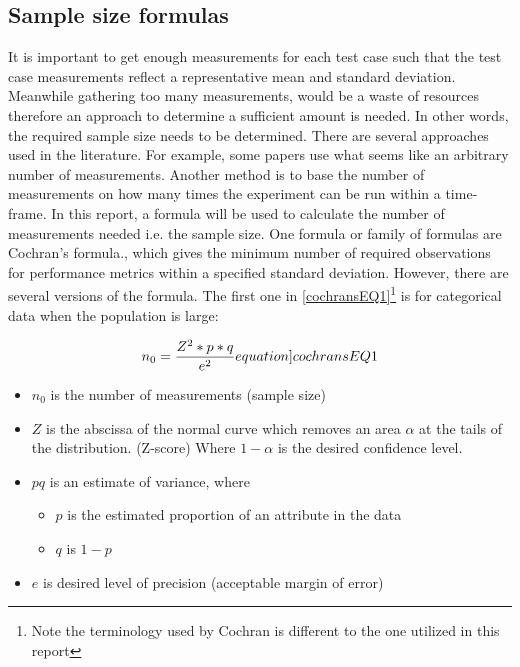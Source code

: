 \subsection{Sample size formulas}
It is important to get enough measurements for each test case such that the test case measurements reflect a representative mean and standard deviation. Meanwhile gathering too many measurements, would be a waste of resources therefore an approach to determine a sufficient amount is needed. In other words, the required sample size needs to be determined. There are several approaches used in the literature. For example, some papers use what seems like an arbitrary number of measurements\cite{Pereira2017,Koedijk2022diff,Georgiou2020}. Another method is to base the number of measurements on how many times the experiment can be run within a time-frame\cite{sestoft2013microbenchmarks}. In this report, a formula will be used to calculate the number of measurements needed i.e. the sample size. One formula or family of formulas are Cochran's formula.\cite{Cochran, kotrlik2001organizational,israel1992determining}, which gives the minimum number of required observations for performance metrics within a specified standard deviation. However, there are several versions of the formula.
The first one in \cref{cochransEQ1}\footnote{Note the terminology used by Cochran is different to the one utilized in this report} is for categorical data when the population is large\cite{israel1992determining}:

\begin{equation}
    n_0 = \frac{Z^2*p*q}{e^2}
    \label[equation]{cochransEQ1}
\end{equation}

\begin{itemize}
    \item $n_0$ is the number of measurements (sample size)
    \item $Z$ is the abscissa of the normal curve which removes an area $\alpha$ at the tails of the distribution. (Z-score) Where $1 - \alpha$ is the desired confidence level.%
    \item $pq$ is an estimate of variance, where
    \begin{itemize}
        \item $p$ is the estimated proportion of an attribute in the data
        \item $q$ is $1 - p$
    \end{itemize}
    \item $e$ is desired level of precision (acceptable margin of error)
\end{itemize}


